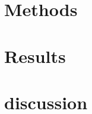 \documentclass[%
 amsmath,amssymb,
 aps,
floatfix,
aps,prd,longbibliography,
notitlepage
]{revtex4-1}
\begin{document}
\section{Methods}\label{sec:methods}



\section{ Results }\label{sec:results}

\section{ discussion } \label{sec:discussion}
\end{document}
